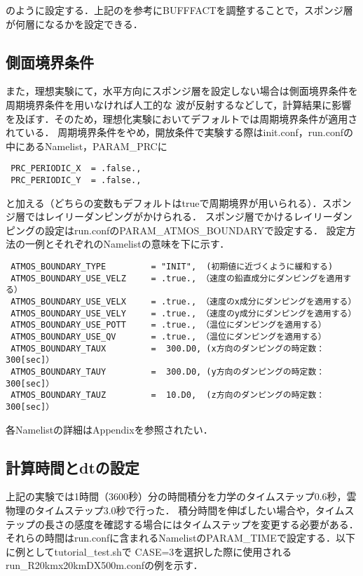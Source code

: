 のように設定する．上記の\cite{eq3.1}を参考にBUFFFACTを調整することで，スポンジ層が何層になるかを設定できる．\\

\subsection{側面境界条件}
また，理想実験にて，水平方向にスポンジ層を設定しない場合は側面境界条件を周期境界条件を用いなければ人工的な
波が反射するなどして，計算結果に影響を及ぼす．そのため，理想化実験においてデフォルトでは周期境界条件が適用されている．
周期境界条件をやめ，開放条件で実験する際はinit.conf，run.confの中にあるNamelist，PARAM\_PRCに

\begin{verbatim}
 PRC_PERIODIC_X  = .false.,
 PRC_PERIODIC_Y  = .false.,
\end{verbatim}

と加える（どちらの変数もデフォルトはtrueで周期境界が用いられる）．スポンジ層ではレイリーダンピングがかけられる．
スポンジ層でかけるレイリーダンピングの設定はrun.confのPARAM\_ATMOS\_BOUNDARYで設定する．
設定方法の一例とそれぞれのNamelistの意味を下に示す．

\begin{verbatim}
 ATMOS_BOUNDARY_TYPE         = "INIT",  (初期値に近づくように緩和する)
 ATMOS_BOUNDARY_USE_VELZ     = .true., （速度の鉛直成分にダンピングを適用する）
 ATMOS_BOUNDARY_USE_VELX     = .true., （速度のx成分にダンピングを適用する）
 ATMOS_BOUNDARY_USE_VELY     = .true., （速度のy成分にダンピングを適用する）
 ATMOS_BOUNDARY_USE_POTT     = .true., （温位にダンピングを適用する）
 ATMOS_BOUNDARY_USE_QV       = .true., （温位にダンピングを適用する）
 ATMOS_BOUNDARY_TAUX         =  300.D0, (x方向のダンピングの時定数：300[sec]）
 ATMOS_BOUNDARY_TAUY         =  300.D0, (y方向のダンピングの時定数：300[sec]）
 ATMOS_BOUNDARY_TAUZ         =  10.D0,  (z方向のダンピングの時定数：300[sec]）
\end{verbatim}

各Namelistの詳細はAppendixを参照されたい．

\subsection{計算時間とdtの設定}
上記の実験では1時間（3600秒）分の時間積分を力学のタイムステップ0.6秒，雲物理のタイムステップ3.0秒で行った．
積分時間を伸ばしたい場合や，タイムステップの長さの感度を確認する場合にはタイムステップを変更する必要がある．
それらの時間はrun.confに含まれるNamelistのPARAM\_TIMEで設定する．以下に例としてtutorial\_test.shで
CASE=3を選択した際に使用されるrun\_R20kmx20kmDX500m.confの例を示す．

